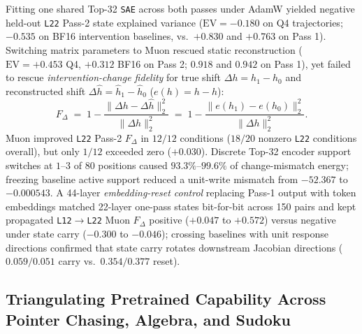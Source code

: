 \documentclass[10pt,letterpaper]{article}
\begin{document}
Fitting one shared Top-32 \texttt{SAE} across both passes under AdamW yielded negative held-out \texttt{L22} Pass-2 state explained variance ($\mathrm{EV} = -0.180$ on Q4 trajectories; $-0.535$ on BF16 intervention baselines, vs.\ $+0.830$ and $+0.763$ on Pass 1). Switching matrix parameters to Muon \cite{jordan2024muon,dugan2026muonsae} rescued static reconstruction ($\mathrm{EV} = +0.453$ Q4, $+0.312$ BF16 on Pass 2; $0.918$ and $0.942$ on Pass 1), yet failed to rescue \emph{intervention-change fidelity} for true shift $\Delta h = h_1 - h_0$ and reconstructed shift $\Delta \hat{h} = \hat{h}_1 - \hat{h}_0$ ($e(h)=h-\hat{h}$):
\begin{equation}
  F_\Delta \;=\; 1 - \frac{\|\Delta h - \Delta \hat{h}\|_2^2}{\|\Delta h\|_2^2}
  \;=\; 1 - \frac{\|e(h_1) - e(h_0)\|_2^2}{\|\Delta h\|_2^2}.
  \label{eq:fdelta}
\end{equation}
Muon improved \texttt{L22} Pass-2 $F_\Delta$ in $12/12$ conditions ($18/20$ nonzero \texttt{L22} conditions overall), but only $1/12$ exceeded zero ($+0.030$). Discrete Top-32 encoder support switches at $1$--$3$ of $80$ positions caused $93.3\%$--$99.6\%$ of change-mismatch energy; freezing baseline active support reduced a unit-write mismatch from $-52.367$ to $-0.000543$. A 44-layer \emph{embedding-reset control} replacing Pass-1 output with token embeddings matched 22-layer one-pass states bit-for-bit across 150 pairs and kept propagated \texttt{L12}$\to$\texttt{L22} Muon $F_\Delta$ positive ($+0.047$ to $+0.572$) versus negative under state carry ($-0.300$ to $-0.046$); crossing baselines with unit response directions confirmed that state carry rotates downstream Jacobian directions ($0.059/0.051$ carry vs.\ $0.354/0.377$ reset).

\subsection{Triangulating Pretrained Capability Across Pointer Chasing, Algebra, and Sudoku}
\end{document}
